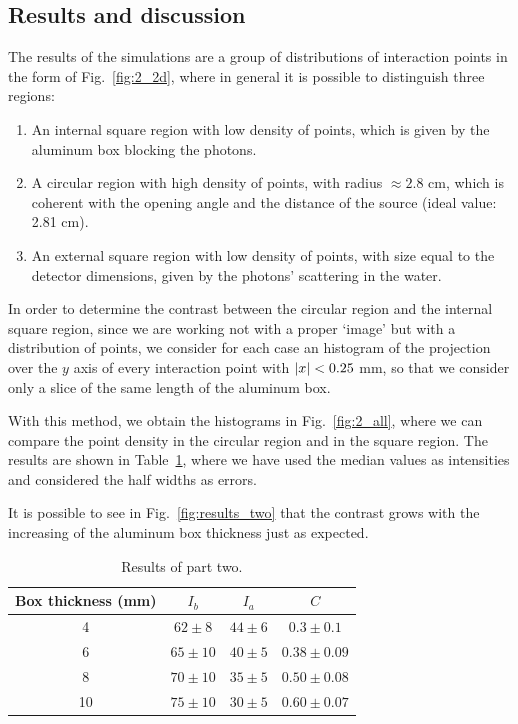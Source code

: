 \documentclass[a4paper]{article}
\begin{document}
\subsection{Results and discussion}
The results of the simulations are a group of distributions of interaction points in the form of Fig.~\ref{fig:2_2d}, where in general it is possible to distinguish three regions:
\begin{enumerate}
  \item An internal square region with low density of points, which is given by the aluminum box blocking the photons.
  \item A circular region with high density of points, with radius $\approx 2.8$ cm, which is coherent with the opening angle and the distance of the source (ideal value: 2.81 cm).
  \item An external square region with low density of points, with size equal to the detector dimensions, given by the photons' scattering in the water.
\end{enumerate}
In order to determine the contrast between the circular region and the internal square region, since we are working not with a proper `image' but with a distribution of points, we consider for each case an histogram of the projection over the $y$ axis of every interaction point with $\abs{x} < 0.25$ mm, so that we consider only a slice of the same length of the aluminum box.

With this method, we obtain the histograms in Fig.~\ref{fig:2_all}, where we can compare the point density in the circular region and in the square region. The results are shown in Table~\ref{tab:part_two}, where we have used the median values as intensities and considered the half widths as errors.

It is possible to see in Fig.~\ref{fig:results_two} that the contrast grows with the increasing of the aluminum box thickness just as expected.

\begin{table}[!htb]
  \centering
  \begin{tabular}{|c|c|c|c|}
    \hline
    Box thickness (mm) & $I_{b}$ & $I_{a}$ & $C$ \\
    \hline
    4 & $62 \pm 8$ & $44 \pm 6$ & $0.3 \pm 0.1$\\
    \hline
    6 & $65 \pm 10$ & $40 \pm 5$ & $0.38 \pm 0.09$\\
    \hline
    8 & $70 \pm 10$ & $35 \pm 5$ & $0.50 \pm 0.08$ \\
    \hline
    10 & $75 \pm 10$ & $30 \pm 5$ & $0.60 \pm 0.07$\\
    \hline
  \end{tabular}
  \caption{Results of part two.}
  \label{tab:part_two}
\end{table}
\end{document}
